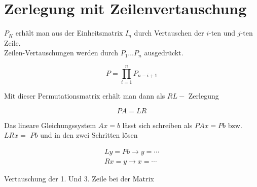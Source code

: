 \documentclass[10pt]{article}
\begin{document}
\section*{Zerlegung mit Zeilenvertauschung}
$P_{K}$ erhält man aus der Einheitsmatrix $I_{n}$ durch Vertauschen der $i$-ten und $j$-ten Zeile.\\
Zeilen-Vertauschungen werden durch $P_{1} \ldots P_{n}$ ausgedrückt.

$$
P=\prod_{i=1}^{n} P_{n-i+1}
$$

Mit dieser Permutationsmatrix erhält man dann als $R L-$ Zerlegung

$$
P A=L R
$$

Das lineare Gleichungssystem $A x=b$ lässt sich schreiben als $P A x=P b$ bzw. $L R x=$ $P b$ und in den zwei Schritten lösen

$$
\begin{gathered}
L y=P b \rightarrow y=\cdots \\
R x=y \rightarrow x=\cdots
\end{gathered}
$$

Vertauschung der 1. Und 3. Zeile bei der Matrix
\end{document}
